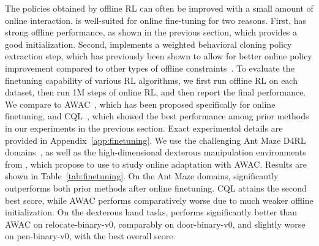 The policies obtained by offline RL can often be improved with a small amount of online interaction.
\ourname is well-suited for online fine-tuning for two reasons.
First, \ourname has strong offline performance, as shown in the previous section, which provides a good initialization.
Second, \ourname implements a weighted behavioral cloning policy extraction step,
which has previously been shown to allow for better online policy improvement compared to other types of offline constraints~\citep{nair2020awac}.
To evaluate the finetuning capability of various RL algorithms, we first run offline RL on each dataset, then run 1M steps of online RL, and then report the final performance.
We compare to AWAC~\citep{nair2020awac}, which has been proposed specifically for online finetuning, and CQL~\citep{kumar2020conservative}, which showed the best performance among prior methods in our experiments in the previous section. Exact experimental details are provided in Appendix~\ref{app:finetuning}. We use the challenging Ant Maze D4RL domains~\citep{fu2020d4rl}, as well as the high-dimensional dexterous manipulation environments from \citet{rajeswaran2018dextrous}, which \citet{nair2020awac} propose to use to study online adaptation with AWAC. Results are shown in Table~\ref{tab:finetuning}. 
On the Ant Maze domains, \ourname significantly outperforms both prior methods after online finetuning. CQL attains the second best score, while AWAC performs comparatively worse due to much weaker offline initialization. On the dexterous hand tasks, \ourname performs significantly better than AWAC on relocate-binary-v0, comparably on door-binary-v0, and slightly worse on pen-binary-v0, with the best overall score.

